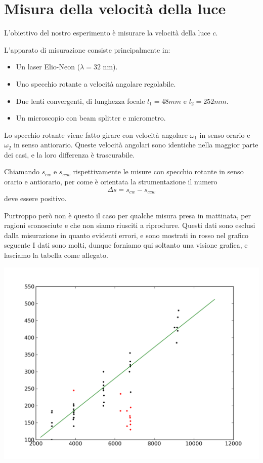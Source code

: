 \chapter{Misura della velocità della luce}

L'obiettivo del nostro esperimento è misurare la velocità della luce $c$.

L'apparato di misurazione consiste principalmente in:
\begin{itemize}
 \item Un laser Elio-Neon ($\lambda=32$ nm).
 \item Uno specchio rotante a velocità angolare regolabile.
 \item Due lenti convergenti, di lunghezza focale $l_1 = 48mm$ e $l_2 = 252 mm$.
 \item Un microscopio con beam splitter e micrometro.
\end{itemize}

Lo specchio rotante viene fatto girare con velocità angolare $\omega_1$ in senso orario e $\omega_2$ in senso antiorario. Queste velocità angolari sono identiche nella maggior parte dei casi, e la loro differenza è trascurabile.

Chiamando $s_{cw}$ e $s_{ccw}$ rispettivamente le misure con specchio rotante in senso orario e antiorario, per come è orientata la strumentazione il numero
$$\Delta s = s_{cw} - s_{ccw}$$
deve essere positivo.

Purtroppo però non è questo il caso per qualche misura presa in mattinata, per ragioni sconosciute e che non siamo riusciti a riprodurre. Questi dati sono esclusi dalla misurazione in quanto evidenti errori, e sono mostrati in rosso nel grafico seguente
I dati sono molti, dunque forniamo qui soltanto una visione grafica, e lasciamo la tabella come allegato.

\includegraphics[scale=0.75]{grafici/C/dati.png}

